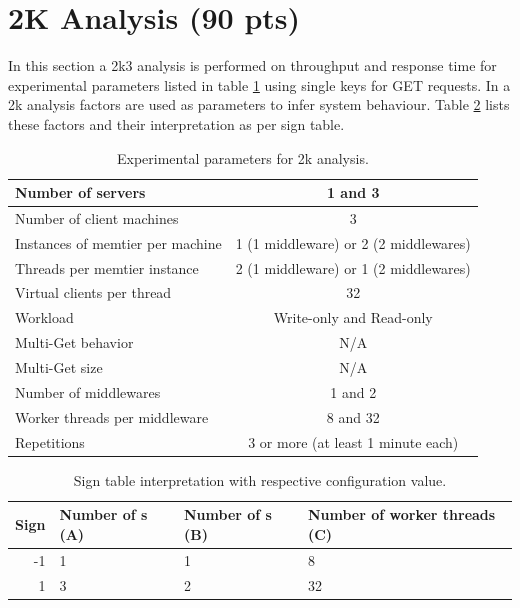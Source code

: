 \section{2K Analysis (90 pts)\label{sec:6}}

    In this section a 2k3 analysis is performed on throughput and response time for experimental parameters listed in
    table \ref{tab:6_setup} using single keys for GET requests. In a 2k analysis factors are used as parameters
    to infer system behaviour. Table \ref{tab:6_2k-factors} lists these factors and their interpretation as per sign
    table.

    \begin{table}
        \scriptsize{
            \begin{tabular}{|l|c|}
                \hline Number of servers                & 1 and 3 \\
                \hline Number of client machines        & 3 \\
                \hline Instances of memtier per machine & 1 (1 middleware) or 2 (2 middlewares) \\
                \hline Threads per memtier instance     & 2 (1 middleware) or 1 (2 middlewares) \\
                \hline Virtual clients per thread       & 32 \\
                \hline Workload                         & Write-only and Read-only \\
                \hline Multi-Get behavior               & N/A \\
                \hline Multi-Get size                   & N/A \\
                \hline Number of middlewares            & 1 and 2 \\
                \hline Worker threads per middleware    & 8 and 32 \\
                \hline Repetitions                      & 3 or more (at least 1 minute each) \\
                \hline
            \end{tabular}
        \caption{Experimental parameters for 2k analysis.\label{tab:6_setup}}
        }
    \end{table}

    \begin{table}
        \small{
            \begin{tabular}{r l l l }
                \toprule
                Sign & Number of \srv{}s (\textbf{A}) & Number of \mw{}s (\textbf{B}) & Number of worker threads (\textbf{C})   \\
                \midrule
                -1  & 1                            & 1                           & 8   \\
                1   & 3                            & 2                           & 32  \\
                \bottomrule
            \end{tabular}
            \caption{Sign table interpretation with respective configuration value.\label{tab:6_2k-factors}}
        }
    \end{table}

